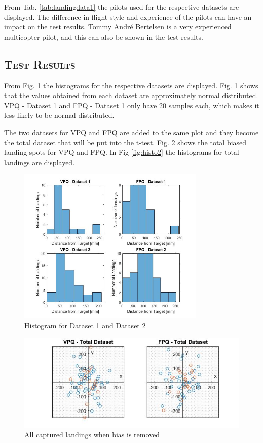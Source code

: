 From Tab. \ref{tab:landingdata1} the pilots used for the respective datasets are displayed. The difference in flight style and experience of the pilots can have an impact on the test results. Tommy André Bertelsen is a very experienced multicopter pilot, and this can also be shown in the test results. 

\subsection{\textsc{\medium Test Results}}
From Fig. \ref{fig:histo1} the histograms for the respective datasets are displayed. Fig. \ref{fig:histo1} shows that the values obtained from each dataset are approximately normal distributed. VPQ - Dataset 1 and FPQ - Dataset 1 only have 20 samples each, which makes it less likely to be normal distributed. \bigskip

The two datasets for VPQ and FPQ are added to the same plot and they become the total dataset that will be put into the t-test. Fig. \ref{fig:totalbiased} shows the total biased landing spots for VPQ and FPQ. In Fig \ref{fig:histo2} the histograms for total landings are displayed.

\begin{figure}[H]
    \centering
    \includegraphics[width = 0.8\textwidth]{VAPIQ-PICTURES/histotomas}
    \caption{Histogram for Dataset 1 and Dataset 2}
    \label{fig:histo1}
\end{figure}

\begin{figure}[H]
    \centering
    \includegraphics[width =1\textwidth]{VAPIQ-PICTURES/totalbiased}
    \caption{All captured landings when bias is removed}
    \label{fig:totalbiased}
\end{figure}

